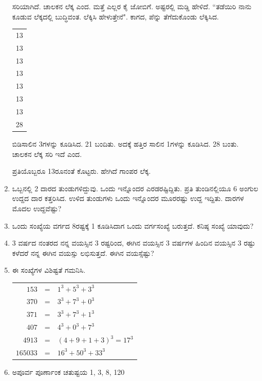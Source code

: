 \begin{enumerate}
ಸರಿಯಾಗಿದೆ. ಚಾಲಕನ ಲೆಕ್ಕ ಎಂದ. ಮತ್ತೆ ಎಲ್ಲರ ಕೈ ಜೋಬಿಗೆ. ಅಷ್ಟರಲ್ಲಿ ಮಡ್ಡಿ ಹೇಳಿದೆ. ``ತಡೆಯಿರಿ ನಾನು ಕೂಡುವ ಲೆಕ್ಕದಲ್ಲಿ ಬುದ್ಧಿವಂತ. ಲೆಕ್ಕಿಸಿ ಹೇಳುತ್ತೇನೆ". ಕಾಗದ, ಪೆನ್ನು ತೆಗೆದುಕೊಂಡು ಲೆಕ್ಕಿಸಿದ. 

\begin{tabular}[t]{c}
13\\
13\\
13\\
13\\
13\\
13\\
13\\
\hline
28\\
\hline
\end{tabular} 

\smallskip

ಬಿಡಿಸಾಲಿನ 3ಗಳನ್ನು ಕೂಡಿಸಿದ. 21 ಬಂದಿತು. ಅದಕ್ಕೆ ಹತ್ತಿರ ಸಾಲಿನ 1ಗಳನ್ನು ಕೂಡಿಸಿದ. 28 ಬಂತು. ಚಾಲಕನ ಲೆಕ್ಕ ಸರಿ ಇದೆ ಎಂದ. 

ಪ್ರತಿಯೊಬ್ಬರೂ 13ರೂನಂತೆ ಕೊಟ್ಟರು. ಹೇಗಿದೆ ಗಾಂಪರ ಲೆಕ್ಕ. 

\item ಒಬ್ಬನಲ್ಲಿ 2 ದಾರದ ತುಂಡುಗಳಿದ್ದುವು. ಒಂದು ಇನ್ನೊಂದರ ಎರಡರಷ್ಟಿದ್ದಿತು. ಪ್ರತಿ ತುಂಡಿನಲ್ಲಿಯೂ 6 ಅಂಗುಲ ಉದ್ದದ ದಾರ ಕತ್ತರಿಸಿದ. ಉಳಿದ ತುಂಡುಗಳು ಒಂದು ಇನ್ನೊಂದರ ಮೂರರಷ್ಟು ಉದ್ದ ಇದ್ದಿತು. ದಾರಗಳ ಮೊದಲ ಉದ್ದವೆಷ್ಟು? 

\item ಒಂದು ಸಂಖ್ಯೆಯ ವರ್ಗದ 8ರಷ್ಟಕ್ಕೆ 1 ಕೂಡಿಸಿದಾಗ ಒಂದು ವರ್ಗಸಂಖ್ಯೆ ಬರುತ್ತದೆ. ಕನಿಷ್ಠ ಸಂಖ್ಯೆ ಯಾವುದು? 

\item 3 ವರ್ಷದ ನಂತರದ ನನ್ನ ವಯಸ್ಸಿನ 3 ರಷ್ಟರಿಂದ, ಈಗಿನ ವಯಸ್ಸಿನ 3 ವರ್ಷಗಳ ಹಿಂದಿನ ವಯಸ್ಸಿನ 3 ರಷ್ಟು ಕಳೆದರೆ ನನ್ನ ಈಗಿನ ವಯಸ್ಸು ಲಭಿಸುತ್ತದೆ. ಈಗಿನ ವಯಸ್ಸೆಷ್ಟು? 

\eject

\item ಈ ಸಂಖ್ಯೆಗಳ ವಿಶಿಷ್ಟತೆ ಗಮನಿಸಿ. 

\begin{tabular}[t]{r@{\;}c@{\;}l}
$153$ & = & $1^{3} + 5^{3} + 3^{3}$\\[0.1cm]
$370$ & = & $3^{3} + 7^{3} + 0^{3}$\\[0.1cm]
$371$ & = & $3^{3} + 7^{3} + 1^{3}$\\[0.1cm]
$407$ & = & $4^{3} + 0^{3} + 7^{3}$\\[0.1cm]
$4913$ & = & $(4 + 9 + 1 + 3)^{3} = 17^{3}$\\[0.1cm]
$165033$ & = & $16^{3} + 50^{3} + 33^{3}$
\end{tabular}

\item ಅಪೂರ್ವ ಪೂರ್ಣಾಂಕ ಚತುಷ್ಟಯ 1, 3, 8, 120


\end{enumerate}
